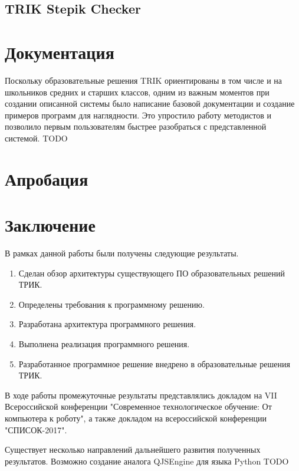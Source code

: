 \documentclass[14pt]{matmex-diploma-custom}
\begin{document}
\subsection{TRIK Stepik Checker}



\section{Документация}
Поскольку образовательные решения TRIK ориентированы в том числе и на школьников средних и старших классов, одним из важным моментов при создании описанной системы было написание базовой документации и создание примеров программ для наглядности. Это упростило работу методистов и позволило первым пользователям быстрее разобраться с представленной системой. TODO

\section{Апробация}


\section*{Заключение}

В рамках данной работы были получены следующие результаты.
\begin{enumerate}
\item Сделан обзор архитектуры существующего ПО образовательных решений ТРИК.
\item Определены требования к программному решению.
\item Разработана архитектура программного решения.
\item Выполнена реализация программного решения.
\item Разработанное программное решение внедрено в образовательные решения ТРИК.
\end{enumerate}



В ходе работы промежуточные результаты представлялись докладом на VII Всероссийской конференции "Современное технологическое обучение: От компьютера к роботу", а также докладом на всероссийской конференции "СПИСОК-2017".

Существует несколько направлений дальнейшего развития полученных результатов. Возможно создание аналога QJSEngine для языка Python TODO

\setmonofont[Mapping=tex-text]{CMU Typewriter Text}


\end{document}
